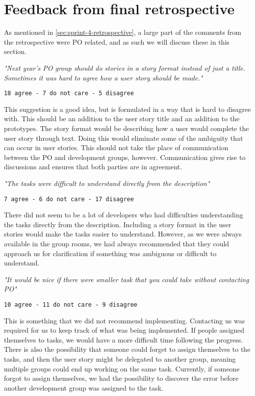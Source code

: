 \section{Feedback from final retrospective}\label{sec:retrospective-discussion}
As mentioned in \autoref{sec:sprint-4-retrospective}, a large part of the comments from the retrospective were PO related, and as such we will discuss these in this section.

\begin{center}
    \textit{"Next year's PO group should do stories in a story format instead of just a title. Sometimes it was hard to agree how a user story should be made."}
\end{center}

\begin{center}
    \texttt{18 agree - 7 do not care - 5 disagree}
\end{center}
This suggestion is a good idea, but is formulated in a way that is hard to disagree with. 
This should be an addition to the user story title and an addition to the prototypes. 
The story format would be describing how a user would complete the user story through text. 
Doing this would eliminate some of the ambiguity that can occur in user stories.
This should not take the place of communication between the PO and development groups, however.
Communication gives rise to discussions and ensures that both parties are in agreement.

\begin{center}
    \textit{"The tasks were difficult to understand directly from the description"}
\end{center}

\begin{center}
    \texttt{7 agree - 6 do not care - 17 disagree}
\end{center}
There did not seem to be a lot of developers who had difficulties understanding the tasks directly from the description. 
Including a story format in the user stories would make the tasks easier to understand.
However, as we were always available in the group rooms, we had always recommended that they could approach us for clarification if something was ambiguous or difficult to understand. 

\begin{center}  
    \textit{"It would be nice if there were smaller task that you could take without contacting PO"}
\end{center}

\begin{center}
    \texttt{10 agree - 11 do not care - 9 disagree}
\end{center}
This is something that we did not recommend implementing. 
Contacting us was required for us to keep track of what was being implemented. 
If people assigned themselves to tasks, we would have a more difficult time following the progress.
There is also the possibility that someone could forget to assign themselves to the tasks, and then the user story might be delegated to another group, meaning multiple groups could end up working on the same task.
Currently, if someone forgot to assign themselves, we had the possibility to discover the error before another development group was assigned to the task.

